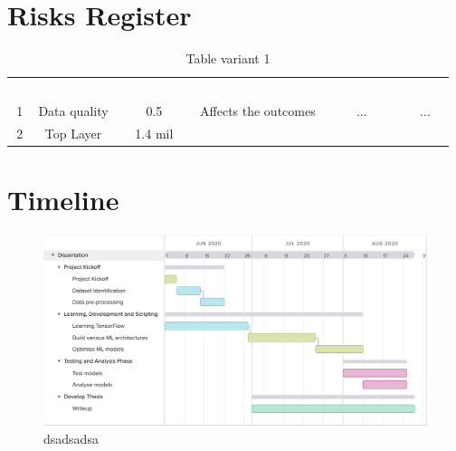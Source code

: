\documentclass[12pt]{article}
\newcommand{\head}[1]{%
    \textcolor{white}{\textbf{#1}}}
\begin{document}
\section{Risks Register}
   
\begin{table}[!h]
    \centering
    \sffamily
    \caption{Table variant 1} \label{tb:1}
    \begin{tabular}{|cccccc|}
        \rowcolor{black!75}
        \head{\#} & \head{Risk }& \head{Likelihood} & \head{Impact} & \head{Mitigation} & \head{Score}\\ 
        1 & Data quality & 0.5 & Affects the outcomes & ... & ...  \\ 
        \hline 
        2 & Top Layer & 1.4 mil &  \\ 
    \end{tabular} 
\end{table}



    
\section{Timeline}
    
\begin{figure}[!h]
  \includegraphics[width=\linewidth,scale=0.5]{timeline.png}
  \caption{dsadsadsa}
\end{figure}
    
  \newPage  
   
\printbibliography
 
  
    
\end{document}
